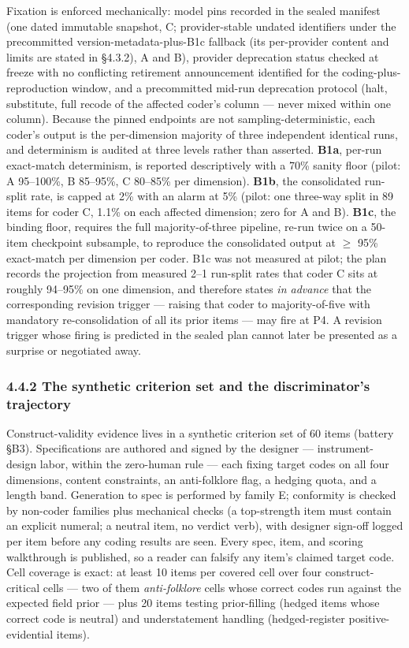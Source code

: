 Fixation is enforced mechanically: model pins recorded in the sealed manifest (one dated immutable snapshot, C; provider-stable undated identifiers under the precommitted version-metadata-plus-B1c fallback (its per-provider content and limits are stated in \S{}4.3.2), A and B), provider deprecation status checked at freeze with no conflicting retirement announcement identified for the coding-plus-reproduction window, and a precommitted mid-run deprecation protocol (halt, substitute, full recode of the affected coder's column --- never mixed within one column). Because the pinned endpoints are not sampling-deterministic, each coder's output is the per-dimension majority of three independent identical runs, and determinism is audited at three levels rather than asserted. \textbf{B1a}, per-run exact-match determinism, is reported descriptively with a 70\% sanity floor (pilot: A 95--100\%, B 85--95\%, C 80--85\% per dimension). \textbf{B1b}, the consolidated run-split rate, is capped at 2\% with an alarm at 5\% (pilot: one three-way split in 89 items for coder C, 1.1\% on each affected dimension; zero for A and B). \textbf{B1c}, the binding floor, requires the full majority-of-three pipeline, re-run twice on a 50-item checkpoint subsample, to reproduce the consolidated output at $\ge$ 95\% exact-match per dimension per coder. B1c was not measured at pilot; the plan records the projection from measured 2--1 run-split rates that coder C sits at roughly 94--95\% on one dimension, and therefore states \emph{in advance} that the corresponding revision trigger --- raising that coder to majority-of-five with mandatory re-consolidation of all its prior items --- may fire at P4. A revision trigger whose firing is predicted in the sealed plan cannot later be presented as a surprise or negotiated away.

\subsubsection{4.4.2 The synthetic criterion set and the discriminator's trajectory}\label{the-synthetic-criterion-set-and-the-discriminators-trajectory}

Construct-validity evidence lives in a synthetic criterion set of 60 items (battery \S{}B3). Specifications are authored and signed by the designer --- instrument-design labor, within the zero-human rule --- each fixing target codes on all four dimensions, content constraints, an anti-folklore flag, a hedging quota, and a length band. Generation to spec is performed by family E; conformity is checked by non-coder families plus mechanical checks (a top-strength item must contain an explicit numeral; a neutral item, no verdict verb), with designer sign-off logged per item before any coding results are seen. Every spec, item, and scoring walkthrough is published, so a reader can falsify any item's claimed target code. Cell coverage is exact: at least 10 items per covered cell over four construct-critical cells --- two of them \emph{anti-folklore} cells whose correct codes run against the expected field prior --- plus 20 items testing prior-filling (hedged items whose correct code is neutral) and understatement handling (hedged-register positive-evidential items).

